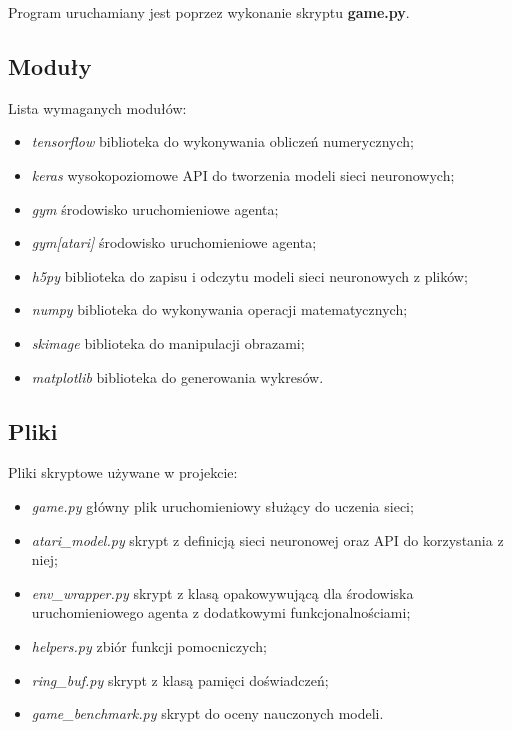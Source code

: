 \documentclass[12pt]{article}
\begin{document}
Program uruchamiany jest poprzez wykonanie skryptu \textbf{game.py}.

\subsection{Moduły}
Lista wymaganych modułów:
\begin{itemize}
\item \textit{tensorflow} biblioteka do wykonywania obliczeń numerycznych;
\item \textit{keras} wysokopoziomowe API do tworzenia modeli sieci neuronowych;
\item \textit{gym} środowisko uruchomieniowe agenta;
\item \textit{gym[atari]} środowisko uruchomieniowe agenta;
\item \textit{h5py} biblioteka do zapisu i odczytu modeli sieci neuronowych z plików;
\item \textit{numpy} biblioteka do wykonywania operacji matematycznych;
\item \textit{skimage} biblioteka do manipulacji obrazami;
\item \textit{matplotlib} biblioteka do generowania wykresów.
\end{itemize}

\subsection{Pliki}
Pliki skryptowe używane w projekcie:
\begin{itemize}
\item \textit{game.py} główny plik uruchomieniowy służący do uczenia sieci;
\item \textit{atari\_model.py} skrypt z definicją sieci neuronowej oraz API do korzystania z niej;
\item \textit{env\_wrapper.py} skrypt z klasą opakowywującą dla środowiska uruchomieniowego agenta z dodatkowymi funkcjonalnościami;
\item \textit{helpers.py} zbiór funkcji pomocniczych;
\item \textit{ring\_buf.py} skrypt z klasą pamięci doświadczeń;
\item \textit{game\_benchmark.py} skrypt do oceny nauczonych modeli.
\end{itemize}
\end{document}
